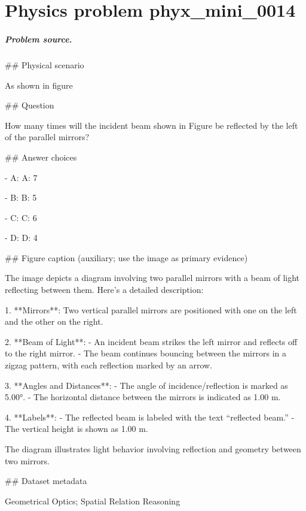 
\chapter{Physics problem phyx\_mini\_0014}
\label{ch:PhyXMiniProblems_problem_phyx_mini_0014}

\paragraph{Problem source.}
\#\# Physical scenario

As shown in figure

\#\# Question

How many times will the incident beam shown in Figure be reflected by the left of the parallel mirrors?

\#\# Answer choices

- A: A: 7

- B: B: 5

- C: C: 6

- D: D: 4

\#\# Figure caption (auxiliary; use the image as primary evidence)

The image depicts a diagram involving two parallel mirrors with a beam of light reflecting between them. Here's a detailed description:

1. **Mirrors**: Two vertical parallel mirrors are positioned with one on the left and the other on the right.

2. **Beam of Light**: 
   - An incident beam strikes the left mirror and reflects off to the right mirror.
   - The beam continues bouncing between the mirrors in a zigzag pattern, with each reflection marked by an arrow.

3. **Angles and Distances**: 
   - The angle of incidence/reflection is marked as 5.00°.
   - The horizontal distance between the mirrors is indicated as 1.00 m.
   
4. **Labels**:
   - The reflected beam is labeled with the text “reflected beam.”
   - The vertical height is shown as 1.00 m.

The diagram illustrates light behavior involving reflection and geometry between two mirrors.

\#\# Dataset metadata

Geometrical Optics; Spatial Relation Reasoning

